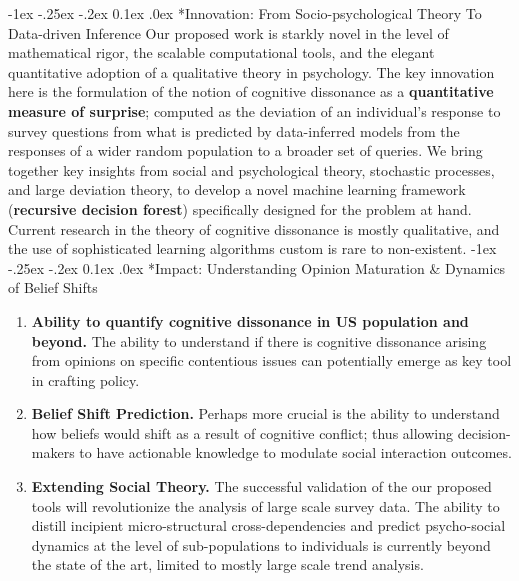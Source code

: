 \documentclass[onecolumn, compsoc,11pt]{IEEEtran}
\makeatletter
\renewcommand\subsection{\@startsection {section}{1}{\z@}%
                                   {-1ex \@plus -.25ex \@minus -.2ex}%
                                   {0.1ex \@plus.0ex}%
                                   {\fontsize{11}{10}\selectfont\bfseries\sffamily\color{DodgerBlue4}}}
\newcommand{\tball}[1][CadetBlue4]{${\color{#1}\Large\boldsymbol{\blacksquare}}$}
\makeatother
\begin{document}
\subsection*{Innovation: From Socio-psychological Theory To Data-driven Inference}
Our proposed work is starkly novel in the level of mathematical rigor, the scalable computational tools, and the elegant quantitative adoption of a qualitative theory in psychology. The key innovation here  is the formulation of the notion of cognitive dissonance as a \textbf{quantitative  measure of surprise}; computed as the deviation of an individual's response to
survey questions from what is predicted by data-inferred models from the  responses of a wider random population  to a broader set of queries. We bring together key insights from social and psychological theory, stochastic processes, and large deviation theory, to develop a novel machine learning framework (\textbf{recursive decision forest}) specifically designed for the problem at hand. Current research in the theory of cognitive dissonance is mostly qualitative, and the use of sophisticated learning algorithms custom is rare to non-existent. 
\subsection*{Impact: Understanding  Opinion Maturation \& Dynamics of Belief Shifts }
\begin{enumerate}
[label=\tball, leftmargin=0pt,
labelindent=0em, topsep=0.1em, labelsep=*, itemsep=.15em,itemindent=2em]\color{black} \sffamily\fontsize{11}{12}\selectfont
\item  \textbf{Ability to quantify cognitive dissonance in US population and beyond.}  The ability to understand if there is cognitive dissonance arising from opinions on specific contentious  issues can potentially emerge as key tool in crafting policy.
\item  \textbf{Belief Shift Prediction.} Perhaps more crucial is the ability to understand how beliefs would shift as a result of cognitive conflict; thus allowing decision-makers to have actionable knowledge to modulate social interaction outcomes.%
\item \textbf{Extending Social Theory.} The successful validation of the our proposed tools will revolutionize the analysis of large scale survey data. The ability to distill incipient micro-structural  cross-dependencies and predict psycho-social dynamics at the level of sub-populations to individuals is currently beyond the state of the art, limited to mostly large scale trend analysis.
\end{enumerate}
\end{document}
